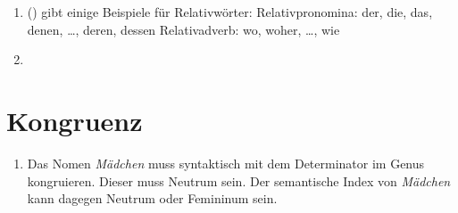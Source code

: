 \begin{enumerate}
\item () gibt einige Beispiele für Relativwörter:
\eal
\ex Relativpronomina: der, die, das, denen, \ldots, deren, dessen
\ex Relativadverb: wo, woher, \ldots, wie 
\zl


\item \begin{figure}[H]
\end{figure}
\end{enumerate}


\section{Kongruenz}

\begin{enumerate}
\item Das Nomen \emph{Mädchen} muss syntaktisch mit dem Determinator im Genus kongruieren. Dieser
  muss Neutrum sein. Der semantische Index von \emph{Mädchen} kann dagegen Neutrum oder Femininum sein.
\end{enumerate}

